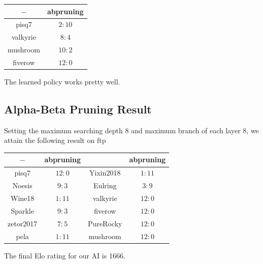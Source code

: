 \documentclass[a4paper, 12pt]{article} %
\begin{document}
\begin{multicols}{2}
		\begin{center}
			\begin{tabular}{|c|c|}
				\hline$-$ & abpruning\\
				\hline \hline pisq7 & $2:10$ \\
				\hline \hline valkyrie & $8:4$ \\
				\hline \hline mushroom & $10: 2$ \\
				\hline \hline fiverow & $12: 0$ \\
				\hline
			\end{tabular}
		\end{center}
		
		The learned policy works pretty well.
		
		\subsection{Alpha-Beta Pruning Result}
		Setting the maximum searching depth 8 and maximum branch of each layer 8, we attain the following result on ftp
		
		\begin{tabular}{|c|c|c|c|}
			\hline$-$ & abpruning & & abpruning\\
			\hline \hline pisq7 & $12: 0$ & Yixin2018 & $1: 11$ \\
			\hline \hline Noesis & $9: 3$ & Eulring & $3: 9$ \\
			\hline \hline Wine18 & $1: 11$ & valkyrie & $12: 0$\\
			\hline \hline Sparkle & $9: 3$ & fiverow & $12: 0$ \\
			\hline \hline zetor2017 & $7: 5$ & PureRocky & $12: 0$ \\
			\hline \hline pela & $1: 11$ & mushroom & $12: 0$ \\
			\hline
		\end{tabular}
		
		The final Elo rating for our AI is 1666.
	\end{multicols}

	\bigskip
	
\end{document}
